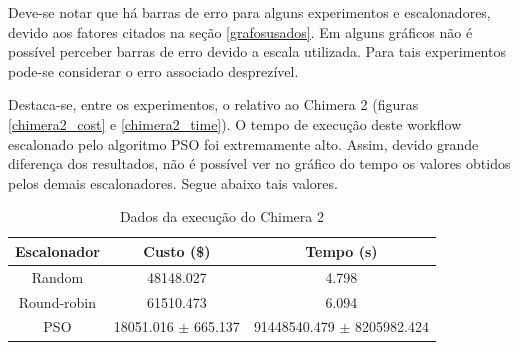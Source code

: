 \documentclass[a4paper,10pt]{article}
\begin{document}
Deve-se notar que há barras de erro para alguns experimentos e escalonadores,
devido aos fatores citados na seção \ref{grafosusados}. Em alguns gráficos não
é possível perceber barras de erro devido a escala utilizada. Para tais experimentos
pode-se considerar o erro associado desprezível.

Destaca-se, entre os experimentos, o relativo ao Chimera 2 (figuras \ref{chimera2_cost} e 
\ref{chimera2_time}). O tempo de execução deste workflow escalonado pelo algoritmo PSO
foi extremamente alto. Assim, devido grande diferença dos
resultados, não é possível ver no gráfico do tempo os valores obtidos pelos demais escalonadores.
Segue abaixo tais valores.

\begin{table}
\centering

  \begin{tabular}{|c|c|c|}  
    \hline
    \textbf{Escalonador} & \textbf{Custo} (\$) & \textbf{Tempo (s)} \\
    \hline
    Random & 48148.027 & 4.798 \\
    \hline
    Round-robin & 61510.473 & 6.094 \\
    \hline
    PSO & 18051.016 $\pm$ 665.137 & 91448540.479 $\pm$ 8205982.424 \\
    \hline

  \end{tabular}
  \caption{Dados da execução do Chimera 2}
  \label{tab:dados_chimera2}
\end{table}
\end{document}
